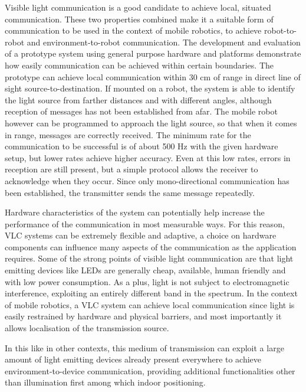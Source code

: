 Visible light communication is a good candidate to achieve local, situated communication.
These two properties combined make it a suitable form of communication to be used in the context of mobile robotics, to achieve robot-to-robot and environment-to-robot communication.
The development and evaluation of a prototype system using general purpose hardware and platforms demonstrate how easily communication can be achieved within certain boundaries.
The prototype can achieve local communication within 30 cm of range in direct line of sight source-to-destination.
If mounted on a robot, the system is able to identify the light source from farther distances and with different angles, although reception of messages has not been established from afar.
The mobile robot however can be programmed to approach the light source, so that when it comes in range, messages are correctly received.
The minimum rate for the communication to be successful is of about 500 Hz with the given hardware setup, but lower rates achieve higher accuracy.
Even at this low rates, errors in reception are still present, but a simple protocol allows the receiver to acknowledge when they occur.
Since only mono-directional communication has been established, the transmitter sends the same message repeatedly.

Hardware characteristics of the system can potentially help increase the performance of the communication in most measurable ways.
For this reason, VLC systems can be extremely flexible and adaptive, a choice on hardware components can influence many aspects of the communication as the application requires.
Some of the strong points of visible light communication are that light emitting devices like LEDs are generally cheap, available, human friendly and with low power consumption.
As a plus, light is not subject to electromagnetic interference, exploiting an entirely different band in the spectrum.
In the context of mobile robotics, a VLC system can achieve local communication since light is easily restrained by hardware and physical barriers, and most importantly it allows localisation of the transmission source.

In this like in other contexts, this medium of transmission can exploit a large amount of light emitting devices already present everywhere to achieve environment-to-device communication, providing additional functionalities other than illumination first among which indoor positioning.

